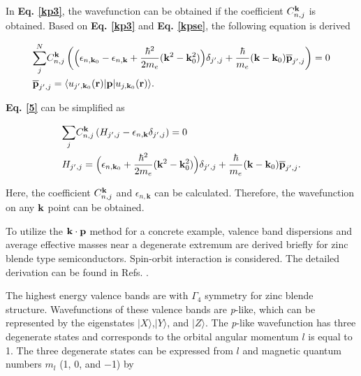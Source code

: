 \documentclass[a4paper, 12pt, titlepage,oneside,drop]{kthesis}
\begin{document}
In \textbf{Eq. \ref{kp3}}, the wavefunction can be obtained if the coefficient $C_{n,j}^{\bold k}$ is obtained. Based on \textbf{Eq. \ref{kp3}} and  \textbf{Eq. \ref{kpse}}, the following equation is derived

\begin{equation}\begin{split}\label{5}
& {\sum\limits_{j}^{N}}  C_{n,j}^{\bold k} \left(  \Big(  \epsilon_{n,\textbf{k}_0} -  \epsilon_{n,\textbf{k}}  + \frac{{\hbar}^2}{2m_e} { (\bold {k}^2- \bold {k}_0^2)}    \Big) \delta_{j',j} + \frac{\hbar}{m_e} {(\bold {k}-\bold{k}_0)} {\overline{\textbf{p}}_{j',j}} \right ) = 0 \\
& {\overline{\textbf{p}}_{j',j}} = \langle \ubloch<j'><\textbf{k}_0>| {\textbf p} | \ubloch<j><\textbf{k}_0>  \rangle.
\end{split}
\end{equation}

\textbf{Eq. \ref{5}} can be simplified as
 
\begin{equation}\begin{split}\label{6}
& {\sum\limits_{j}} C_{n,j}^{\bold {k}} \left ( H_{j',j}-  \epsilon_{n,\textbf{k}} \delta_{j',j} \right ) =0 \\
& H_{j',j} = \Big(   \epsilon_{n,\textbf{k}_0}  + \frac{{\hbar}^2}{2m_e} { (\bold{k}^2-\bold{k}_0^2)}    \Big) \delta_{j',j} + \frac{\hbar}{m_e} {(\bold{k}-\bold{k}_0)} {\overline{\textbf{p}}_{j',j}}.
\end{split}
\end{equation}

Here, the coefficient $ C_{n,j}^{\bold k}$ and $\epsilon_{n,\textbf{k}}$ can be calculated. Therefore, the wavefunction on any ${ \textbf k}$ point can be obtained.

To utilize the $\bold k \cdot \bold p$ method for a concrete example, valence band dispersions and average effective masses near a degenerate extremum are derived briefly for zinc blende type semiconductors.
Spin-orbit interaction is considered. The detailed derivation can be found in Refs. \cite{fospamp2010, suzuki1995first, dresselhaus1955cyclotron, persson1997relativistic}.


The highest energy valence bands are with $\varGamma_4$ symmetry for zinc blende structure. Wavefunctions of these valence bands are \textit{p}-like, which can be represented by the eigenstates $|X\rangle$,$|Y\rangle$, and $|Z\rangle$. 
The \textit{p}-like wavefunction has three degenerate states and corresponds to the orbital angular momentum $l$ is equal to 1. The three degenerate states can be expressed from $l$ and magnetic quantum numbers $m_l$ (1, 0, and $-$1) by
\end{document}
